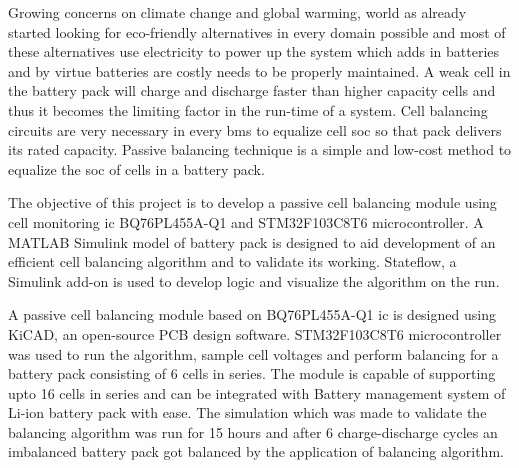 
\vspace{-1cm}


Growing concerns on climate change and global warming, world as already started looking for eco-friendly alternatives in every domain possible and most of these alternatives use electricity to power up the system which adds in batteries and by virtue batteries are costly needs to be properly maintained. A weak cell in the battery pack will charge and discharge faster than  higher capacity cells and thus it becomes the limiting factor in the run-time of a system. Cell balancing circuits are very necessary in every \acrfull{bms} to equalize cell \acrfull{soc}  so that pack delivers its rated capacity. Passive balancing technique is a simple and low-cost method to equalize the \acrshort{soc} of cells in a battery pack. 

The objective of this project is to develop a passive cell balancing module using cell monitoring \acrshort{ic} BQ76PL455A-Q1 and STM32F103C8T6 microcontroller. A MATLAB\textsuperscript{\textregistered} Simulink\textsuperscript{\textregistered} model of battery pack is designed to aid development of an efficient cell balancing algorithm and to validate its working. Stateflow\textsuperscript{\textregistered}, a Simulink\textsuperscript{\textregistered} add-on is used to develop logic and visualize the algorithm on the run.

A passive cell balancing module based on  BQ76PL455A-Q1 \acrshort{ic} is designed using KiCAD, an open-source PCB design software. STM32F103C8T6 microcontroller was used to run the algorithm, sample cell voltages and perform balancing for a battery pack consisting of 6 cells in series. The module is capable of supporting upto 16 cells in series and can be integrated with Battery management system of Li-ion battery pack with ease. The simulation which was made to validate the balancing algorithm was run for 15 hours and after 6 charge-discharge cycles an imbalanced battery pack got balanced by the application of balancing algorithm. 
 
\pagebreak 